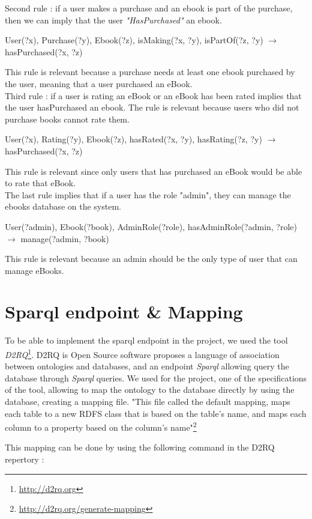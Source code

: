 \documentclass[a4paper,12pt]{article}
\begin{document}
Second rule : if a user makes a purchase and an ebook is part of the purchase, then we can imply that
the user \textit{"HasPurchased"} an ebook. 

User(?x), Purchase(?y), Ebook(?z), isMaking(?x, ?y), isPartOf(?z, ?y) $\rightarrow$ hasPurchased(?x, ?z)

This rule is relevant because a purchase needs at least one ebook purchased by the user, meaning
that a user purchased an eBook.\\

Third rule : if a user is rating an eBook or an eBook has been rated implies that the user hasPurchased an ebook.
The rule is relevant because users who did not purchase books cannot rate them.

User(?x), Rating(?y), Ebook(?z), hasRated(?x, ?y), hasRating(?z, ?y) $\rightarrow$ hasPurchased(?x, ?z)

This rule is relevant since only users that has purchased an eBook would be able to rate that eBook.\\

The last rule implies that if a user has the role "admin", they can manage the ebooks database on the system.

User(?admin), Ebook(?book), AdminRole(?role), hasAdminRole(?admin, ?role) $\rightarrow$ manage(?admin, ?book)

This rule is relevant because an admin should be the only type of user that can manage eBooks.

\section{Sparql endpoint \& Mapping}
To be able to implement the sparql endpoint in the project, we used the tool \textit{D2RQ}\footnote{\url{http://d2rq.org}}. D2RQ is Open Source software proposes a language of association between ontologies and databases, and an endpoint \textit{Sparql} allowing query the database through \textit{Sparql} queries. We used for the project, one of the specifications of the tool, allowing to map the ontology to the database directly by using the database, creating a mapping file. "This file called the default mapping, maps each table to a new RDFS class that is based on the table's name, and maps each column to a property based on the column's name"\footnote{\url{http://d2rq.org/generate-mapping}}

This mapping can be done by using the following command in the D2RQ repertory :
\end{document}
